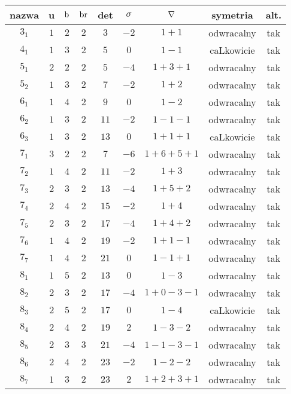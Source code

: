 \renewcommand*{\arraystretch}{1.4}
\footnotesize
\begin{longtable}{ccccccccc}
\hline
nazwa & u & $\operatorname{b}$ & $\operatorname{br}$ & det & $\sigma$ & $\nabla$ & symetria & alt. \\ \hline
\endhead %
$3_{1}$ & $1$ & $2$ & $2$ & $3$ & $-2$ & $1+1$ & odwracalny & tak \\
$4_{1}$ & $1$ & $3$ & $2$ & $5$ & $0$ & $1-1$ & caLkowicie & tak \\
$5_{1}$ & $2$ & $2$ & $2$ & $5$ & $-4$ & $1+3+1$ & odwracalny & tak \\
$5_{2}$ & $1$ & $3$ & $2$ & $7$ & $-2$ & $1+2$ & odwracalny & tak \\
$6_{1}$ & $1$ & $4$ & $2$ & $9$ & $0$ & $1-2$ & odwracalny & tak \\
$6_{2}$ & $1$ & $3$ & $2$ & $11$ & $-2$ & $1-1-1$ & odwracalny & tak \\
$6_{3}$ & $1$ & $3$ & $2$ & $13$ & $0$ & $1+1+1$ & caLkowicie & tak \\
$7_{1}$ & $3$ & $2$ & $2$ & $7$ & $-6$ & $1+6+5+1$ & odwracalny & tak \\
$7_{2}$ & $1$ & $4$ & $2$ & $11$ & $-2$ & $1+3$ & odwracalny & tak \\
$7_{3}$ & $2$ & $3$ & $2$ & $13$ & $-4$ & $1+5+2$ & odwracalny & tak \\
$7_{4}$ & $2$ & $4$ & $2$ & $15$ & $-2$ & $1+4$ & odwracalny & tak \\
$7_{5}$ & $2$ & $3$ & $2$ & $17$ & $-4$ & $1+4+2$ & odwracalny & tak \\
$7_{6}$ & $1$ & $4$ & $2$ & $19$ & $-2$ & $1+1-1$ & odwracalny & tak \\
$7_{7}$ & $1$ & $4$ & $2$ & $21$ & $0$ & $1-1+1$ & odwracalny & tak \\
$8_{1}$ & $1$ & $5$ & $2$ & $13$ & $0$ & $1-3$ & odwracalny & tak \\
$8_{2}$ & $2$ & $3$ & $2$ & $17$ & $-4$ & $1+0-3-1$ & odwracalny & tak \\
$8_{3}$ & $2$ & $5$ & $2$ & $17$ & $0$ & $1-4$ & caLkowicie & tak \\
$8_{4}$ & $2$ & $4$ & $2$ & $19$ & $2$ & $1-3-2$ & odwracalny & tak \\
$8_{5}$ & $2$ & $3$ & $3$ & $21$ & $-4$ & $1-1-3-1$ & odwracalny & tak \\
$8_{6}$ & $2$ & $4$ & $2$ & $23$ & $-2$ & $1-2-2$ & odwracalny & tak \\
$8_{7}$ & $1$ & $3$ & $2$ & $23$ & $2$ & $1+2+3+1$ & odwracalny & tak \\

\end{longtable}
